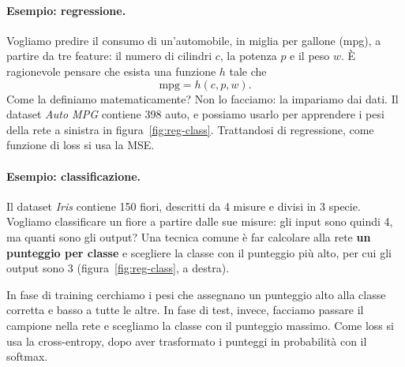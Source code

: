 \paragraph{Esempio: regressione.}
Vogliamo predire il consumo di un'automobile, in miglia per gallone (mpg), a partire da tre feature: il numero di cilindri $c$, la potenza $p$ e il peso $w$. È ragionevole pensare che esista una funzione $h$ tale che
\[
\mathrm{mpg} = h(c, p, w).
\]
Come la definiamo matematicamente? Non lo facciamo: la impariamo dai dati. Il dataset \emph{Auto MPG} contiene 398 auto, e possiamo usarlo per apprendere i pesi della rete a sinistra in figura~\ref{fig:reg-class}. Trattandosi di regressione, come funzione di loss si usa la MSE.

\paragraph{Esempio: classificazione.}
Il dataset \emph{Iris} contiene 150 fiori, descritti da 4 misure e divisi in 3 specie. Vogliamo classificare un fiore a partire dalle sue misure: gli input sono quindi 4, ma quanti sono gli output? Una tecnica comune è far calcolare alla rete \textbf{un punteggio per classe} e scegliere la classe con il punteggio più alto, per cui gli output sono 3 (figura~\ref{fig:reg-class}, a destra).

In fase di training cerchiamo i pesi che assegnano un punteggio alto alla classe corretta e basso a tutte le altre. In fase di test, invece, facciamo passare il campione nella rete e scegliamo la classe con il punteggio massimo. Come loss si usa la cross-entropy, dopo aver trasformato i punteggi in probabilità con il softmax.

